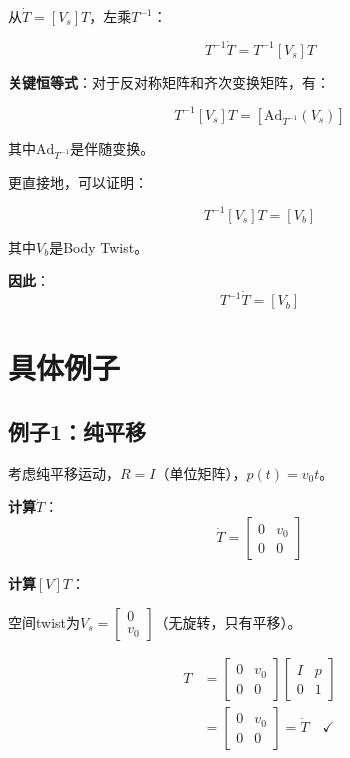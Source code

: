 \documentclass[12pt,a4paper]{article}
\begin{document}
从$\dot{T} = [V_s] T$，左乘$T^{-1}$：

\begin{equation}
T^{-1} \dot{T} = T^{-1} [V_s] T
\end{equation}

\textbf{关键恒等式}：对于反对称矩阵和齐次变换矩阵，有：

\begin{equation}
T^{-1} [V_s] T = [\text{Ad}_{T^{-1}}(V_s)]
\end{equation}

其中$\text{Ad}_{T^{-1}}$是伴随变换。

更直接地，可以证明：

\begin{equation}
T^{-1} [V_s] T = [V_b]
\end{equation}

其中$V_b$是Body Twist。

\textbf{因此}：
\begin{equation}
T^{-1} \dot{T} = [V_b]
\end{equation}

\section{具体例子}

\subsection{例子1：纯平移}

考虑纯平移运动，$R = I$（单位矩阵），$p(t) = v_0 t$。

\textbf{计算$\dot{T}$}：
\begin{equation}
\dot{T} = \begin{bmatrix} 0 & v_0 \\ 0 & 0 \end{bmatrix}
\end{equation}

\textbf{计算$[V]T$}：

空间twist为$V_s = \begin{bmatrix} 0 \\ v_0 \end{bmatrix}$（无旋转，只有平移）。

\begin{align}
[V_s]T &= \begin{bmatrix} 0 & v_0 \\ 0 & 0 \end{bmatrix} \begin{bmatrix} I & p \\ 0 & 1 \end{bmatrix} \\
&= \begin{bmatrix} 0 & v_0 \\ 0 & 0 \end{bmatrix} = \dot{T} \quad \checkmark
\end{align}
\end{document}
